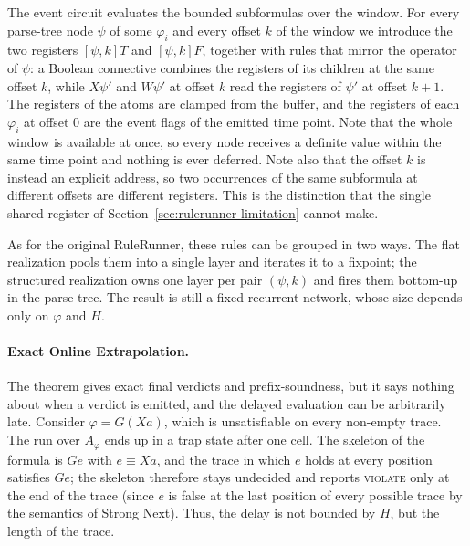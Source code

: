 The event circuit evaluates the bounded subformulas over the window. For every parse-tree node $\psi$ of some $\varphi_i$ and every offset $k$ of the window we introduce the two registers $[\psi,k]T$ and $[\psi,k]F$, together with rules that mirror the operator of $\psi$: a Boolean connective combines the registers of its children at the same offset $k$, while $X\psi'$ and $W\psi'$ at offset $k$ read the registers of $\psi'$ at offset $k+1$. The registers of the atoms are clamped from the buffer, and the registers of each $\varphi_i$ at offset $0$ are the event flags of the emitted time point.
%
Note that the whole window is available at once, so every node receives a
definite value within the same time point and nothing is ever deferred. Note also that the offset $k$ is instead an explicit address, so two occurrences of
the same subformula at different offsets are different registers. This is the
distinction that the single shared register of
Section~\ref{sec:rulerunner-limitation} cannot make.

As for the original RuleRunner, these rules can be grouped in two ways. The flat realization pools them into a single layer and iterates it to a fixpoint; the structured realization owns one layer per pair $(\psi,k)$ and fires them bottom-up in the parse tree. The result is still a fixed recurrent network, whose size depends only on $\varphi$ and $H$.

\paragraph{Exact Online Extrapolation.}
The theorem gives exact final verdicts and prefix-soundness, but it says nothing about when a verdict is emitted, and the delayed evaluation can be arbitrarily late. 
Consider $\varphi=G(Xa)$, which is unsatisfiable on every non-empty trace. The run over $A_\varphi$ ends up in a trap state after one cell. The skeleton of the formula is $Ge$ with $e\equiv Xa$, and the trace in which $e$ holds at every position satisfies $Ge$; the skeleton therefore stays undecided and reports \textsc{violate} only at the end of the trace (since $e$ is false at the last position of every possible trace by the semantics of Strong Next). Thus, the delay is not bounded by $H$, but the length of the trace.

